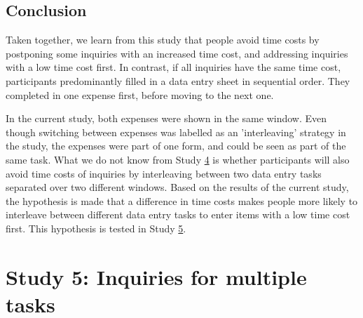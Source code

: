 
\subsection{Conclusion}
Taken together, we learn from this study that people avoid time costs by postponing some inquiries with an increased time cost, and addressing inquiries with a low time cost first. In contrast, if all inquiries have the same time cost, participants predominantly filled in a data entry sheet in sequential order. They completed in one expense first, before moving to the next one. 

In the current study, both expenses were shown in the same window. Even though switching between expenses was labelled as an 'interleaving' strategy in the study, the expenses were part of one form, and could be seen as part of the same task. What we do not know from Study \hyperref[st:Study4]{4} is whether participants will also avoid time costs of inquiries by interleaving between two data entry tasks separated over two different windows. Based on the results of the current study, the hypothesis is made that a difference in time costs makes people more likely to interleave between different data entry tasks to enter items with a low time cost first. This hypothesis is tested in Study \hyperref[st:Study5]{5}.



\section{Study 5: Inquiries for multiple tasks}\label{st:Study5}
